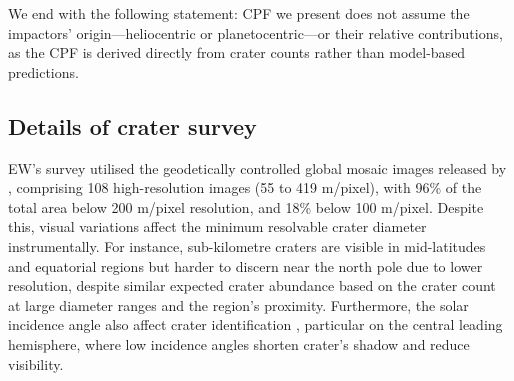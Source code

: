 \documentclass[preprint,11pt,3p,times,authoryear]{elsarticle}
\begin{document}
We end with the following statement: CPF we present does not assume the impactors' origin—heliocentric or planetocentric—or their relative contributions, as the CPF is derived directly from crater counts rather than model-based predictions.



\subsection{Details of crater survey}
\label{sub:survey}
EW’s survey utilised the geodetically controlled global mosaic images released by \citet{Bland2018}, comprising 108 high-resolution images (55 to 419 m/pixel), with 96\% of the total area below 200 m/pixel resolution, and 18\% below 100 m/pixel. Despite this, visual variations affect the minimum resolvable crater diameter instrumentally. For instance, sub-kilometre craters are visible in mid-latitudes and equatorial regions but harder to discern near the north pole due to lower resolution, despite similar expected crater abundance based on the crater count at large diameter ranges and the region’s proximity. Furthermore, the solar incidence angle also affect crater identification \citep{Ostrach2011}, particular on the central leading hemisphere, where low incidence angles shorten crater's shadow and reduce visibility.\\
\end{document}
